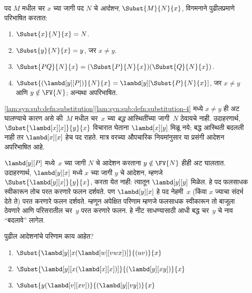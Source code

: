 \begin{defn}[आदेशन] \label{lam:syn:sub:defn:substitution}
  पद $M$ मधील चर $x$ च्या जागी पद $N$ चे
  \emph{आदेशन}, $\Subst{M}{N}{x}$, विगमनाने पुढीलप्रमाणे
  परिभाषित करतात:
  \begin{enumerate}
    \item $\Subst{x}{N}{x} = N$. \label{lam:syn:sub:defn:substitution-1}
    \item $\Subst{y}{N}{x}  = y$, जर $x \neq y$. \label{lam:syn:sub:defn:substitution-2}
    \item $\Subst{PQ}{N}{x}  = (\Subst{P}{N}{x}) (\Subst{Q}{N}{x})$.
      \label{lam:syn:sub:def:substitution-3}
    \item $\Subst{(\lambd[y][P])}{N}{x} = \lambd[y][\Subst{P}{N}{x}]$,
      जर $x \neq y$ आणि $y \notin \FV{N}$; अन्यथा अपरिभाषित.
      \label{lam:syn:sub:defn:substitution-4}
  \end{enumerate}
\end{defn}

\begin{explain}
\ref{lam:syn:sub:defn:substitution}\ref{lam:syn:sub:defn:substitution-4} मध्ये
$x \neq y$ ही अट घालण्याचे कारण असे की~$M$ मधील
चर~$x$ च्या \emph{बद्ध} आस्थितींच्या जागी~$N$ ठेवायचे नाही.
उदाहरणार्थ, $\Subst{\lambd[x][x]}{y}{x}$ विचारात घेताना
$\lambd[x][y]$ मिळू नये; बद्ध आस्थिती बदलली नाही तर
$\lambd[x][x]$ हेच पद राहते. मात्र वरच्या औपचारिक
नियमांनुसार या प्रसंगी आदेशन अपरिभाषित आहे.

$\lambd[y][P]$ मध्ये~$x$ च्या जागी $N$ चे आदेशन करताना
$y \notin \FV{N}$ हीही अट घालतात. उदाहरणार्थ,
$\lambd[y][x]$ मध्ये $x$ च्या जागी $y$ चे आदेशन,
म्हणजे $\Subst{\lambd[y][x]}{y}{x}$, करता येत नाही:
त्यातून $\lambd[y][y]$ मिळेल. हे पद फलसाधक स्वीकारून
तोच परत करणारे फलन दर्शवते. पण $\lambd[y][x]$ हे पद
नेहमी~$x$ (किंवा $x$ ज्याचा संदर्भ देते ते) परत करणारे
फलन दर्शवते. म्हणून अपेक्षित परिणाम म्हणजे फलसाधक
स्वीकारून तो बाजूला ठेवणारे आणि परिसरातील चर~$y$
परत करणारे फलन. हे नीट साधण्यासाठी आधी बद्ध चर~$y$
चे नाव ``बदलावे'' लागेल.
\end{explain}

\begin{prob}
  पुढील आदेशनांचे परिणाम काय आहेत?
  \begin{enumerate}
  \item $\Subst{\lambd[y][x(\lambd[w][vwx])]}{(uv)}{x}$
  \item $\Subst{\lambd[y][x(\lambd[x][x])]}{(\lambd[y][xy])}{x}$
  \item $\Subst{y(\lambd[v][xv])}{(\lambd[y][vy])}{x}$
  \end{enumerate}
\end{prob}

